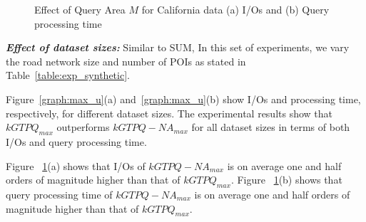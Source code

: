 \begin{figure}[htbp]
\begin{center}
\begin{tabular}{cc}
        \end{tabular}
    \caption{Effect of Query Area $M$ for California data (a) I/Os and (b) Query processing time}
    \label{graph:max_m}
  \end{center}
   \vspace{-6mm}
\end{figure}
\vspace*{10pt}


\textbf{\emph{Effect of dataset sizes: }} Similar to SUM, In this set of experiments, we vary the road network size and number of POIs as stated in Table~\ref{table:exp_synthetic}.

Figure~\ref{graph:max_u}(a) and~\ref{graph:max_u}(b) show I/Os and processing time, respectively, for
different dataset sizes. The experimental results show that
$kGTPQ_{max}$ outperforms $kGTPQ-NA_{max}$ for all dataset sizes in terms
of both I/Os and query processing time.

Figure ~\ref{graph:max_m}(a)
shows that I/Os of $kGTPQ-NA_{max}$ is on average one and half orders of magnitude higher
than that of $kGTPQ_{max}$.
Figure ~\ref{graph:max_m}(b)
shows that query processing time of $kGTPQ-NA_{max}$ is on average one and half orders of magnitude higher
than that of $kGTPQ_{max}$.

